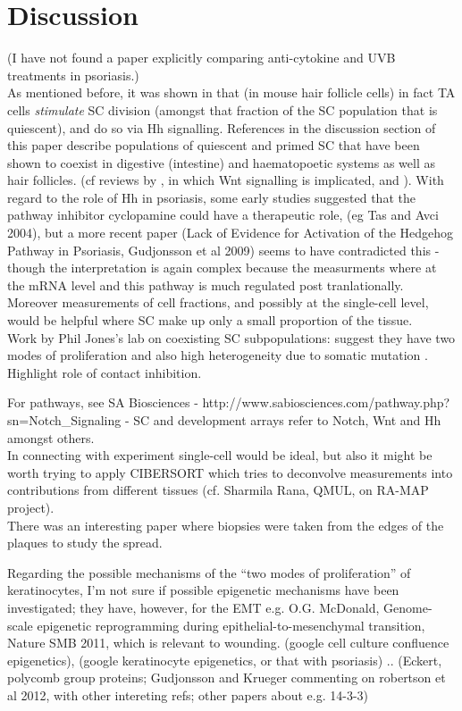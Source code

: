 \documentclass[a4paper,10pt]{report}
\begin{document}
\chapter{Discussion}



(I have not found a paper explicitly comparing anti-cytokine and UVB treatments in psoriasis.)
\\

As mentioned before, it was shown in \cite{hsu2014transit} that (in mouse hair follicle cells) in fact TA cells {\em stimulate} SC division
 (amongst that fraction of the SC population that is quiescent), and do so via Hh signalling. References in the discussion section of this paper describe populations of quiescent and primed SC that have been shown to coexist in digestive (intestine) and haematopoetic systems as well as hair follicles. (cf reviews by \cite{li2010coexistence}, in which Wnt signalling is implicated, and \cite{xin2016hardwiring}). 
With regard to the role of Hh in psoriasis, some early studies suggested that the pathway inhibitor cyclopamine could have a therapeutic role, (eg Tas and Avci 2004), 
but a more recent paper (Lack of Evidence for Activation of the Hedgehog Pathway in Psoriasis, Gudjonsson et al 2009) seems to have contradicted this  - though the interpretation is again complex because the measurments where at the mRNA level and this pathway is much regulated post tranlationally. Moreover measurements of cell fractions, and possibly at the single-cell level, would be helpful where SC make up only a small proportion of the tissue. 
\\
Work by Phil Jones's lab on coexisting SC subpopulations: 
suggest they have two modes of proliferation \cite{roshan2016human} and also 
high heterogeneity due to somatic mutation \cite{martincorena2015high}. Highlight role of contact
inhibition. 

For pathways, see SA Biosciences - http://www.sabiosciences.com/pathway.php?sn=Notch\_Signaling - SC and development arrays refer to Notch, Wnt and Hh amongst others. 
\\
In connecting with experiment single-cell would be ideal, but also it might be worth trying to apply CIBERSORT which tries to deconvolve measurements into contributions from different tissues (cf. Sharmila Rana, QMUL, on RA-MAP project).
\\ 

There was an interesting paper where biopsies were taken from the edges of the plaques to study the spread.


Regarding the possible mechanisms of the ``two modes of proliferation'' of keratinocytes, I'm not sure if possible epigenetic mechanisms have been investigated;  they have, however, for the EMT e.g. O.G. McDonald, Genome-scale epigenetic reprogramming during epithelial-to-mesenchymal transition, Nature SMB 2011, which is relevant to wounding. (google cell culture confluence epigenetics), (google keratinocyte epigenetics, or that with psoriasis) .. (Eckert, polycomb group proteins; Gudjonsson and Krueger commenting on robertson et al 2012, with other intereting refs; other papers about e.g. 14-3-3)


\newpage

 

\end{document}
